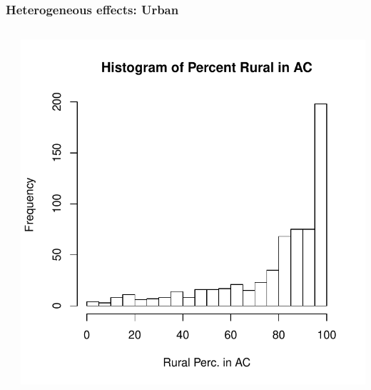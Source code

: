 \documentclass{beamer}
\begin{document}
\begin{frame}
\frametitle{Heterogeneous effects: Urban}
\begin{columns}[T] %
\begin{column}{.48\textwidth}
\end{column}%
\hfill%
\begin{column}{.48\textwidth}
\vspace{-10pt}
\includegraphics[scale=.45]{../Figures/histrurpc.pdf}
\end{column}%
\end{columns}
\end{frame}
\end{document}
